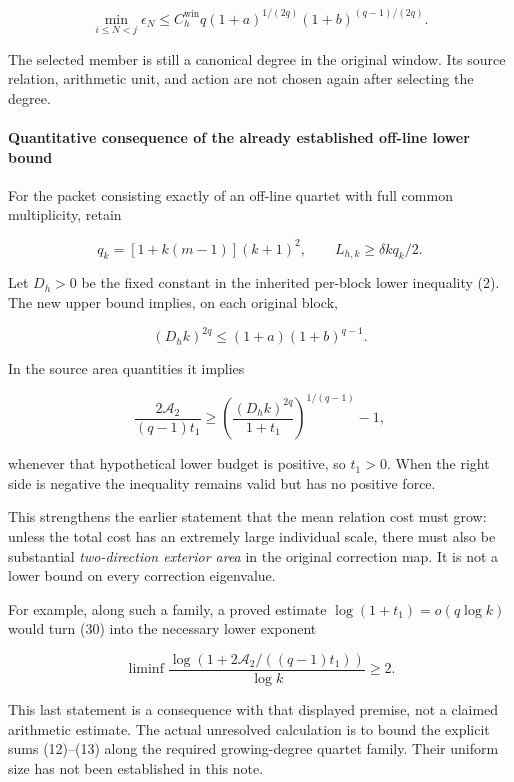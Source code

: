 \[
 \boxed{
 \min_{i\le N<j}\epsilon_N
 \le C_h^{\mathrm{win}}q
 (1+a)^{1/(2q)}(1+b)^{(q-1)/(2q)}.
 }                                                             \tag{28}
\]

The selected member is still a canonical degree in the original window. Its source relation, arithmetic unit, and action are not chosen again after selecting the degree.

\paragraph{Quantitative consequence of the already established off-line lower bound}\label{endpoint-relation_moment_original--quantitative-consequence-of-the-already-established-off-line-lower-bound}

For the packet consisting exactly of an off-line quartet with full common multiplicity, retain

\[
 q_k=[1+k(m-1)](k+1)^2,\qquad L_{h,k}\ge\delta kq_k/2.
\]

Let \(D_h>0\) be the fixed constant in the inherited per-block lower inequality (2). The new upper bound implies, on each original block,

\[
 \boxed{(D_hk)^{2q}\le(1+a)(1+b)^{q-1}.}                        \tag{29}
\]

In the source area quantities it implies

\[
 \boxed{
 \frac{2\mathcal A_2}{(q-1)t_1}
 \ge\left(\frac{(D_hk)^{2q}}{1+t_1}\right)^{1/(q-1)}-1,
 }                                                             \tag{30}
\]

whenever that hypothetical lower budget is positive, so \(t_1>0\). When the right side is negative the inequality remains valid but has no positive force.

This strengthens the earlier statement that the mean relation cost must grow: unless the total cost has an extremely large individual scale, there must also be substantial \emph{two-direction exterior area} in the original correction map. It is not a lower bound on every correction eigenvalue.

For example, along such a family, a proved estimate \(\log(1+t_1)=o(q\log k)\) would turn (30) into the necessary lower exponent

\[
 \liminf\frac{\log(1+2\mathcal A_2/((q-1)t_1))}{\log k}\ge2.
\]

This last statement is a consequence with that displayed premise, not a claimed arithmetic estimate. The actual unresolved calculation is to bound the explicit sums (12)--(13) along the required growing-degree quartet family. Their uniform size has not been established in this note.

